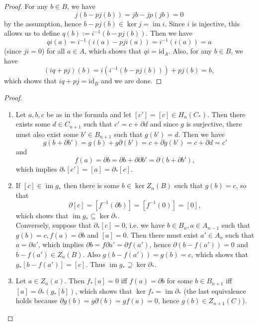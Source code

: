 \documentclass[12pt,a4paper]{article}
\newcommand{\id}{\mathrm{id}}
\DeclareMathOperator{\im}{im}
\newcommand{\dd}{\partial}
\newcounter{exercise}
\begin{document}
\pagestyle{fancy}                      %
\fancyhf{}                             %
\addtolength{\topmargin}{-30 pt}                   %
\setlength{\headsep}{10 pt}                      %
\renewcommand{\headrulewidth}{1 pt}                %
\renewcommand*{\proofname}{Solution}
\ex\mbox{} 
\begin{proof}
For any $b\in B$, we have $$j(b-pj(b))=jb-jp(jb)=0$$ by the assumption, hence $b-pj(b)\in \ker j=\im i$. Since $i$ is injective, this allows us to define $q(b):=i^{-1}(b-pj(b)).$ Then we have $$qi(a)=i^{-1}(i(a)-pji(a))=i^{-1}(i(a))=a$$ (since $ji=0$) for all $a\in A$, which shows that $qi=\id_A$. Also, for any $b\in B$, we have $$(iq+pj)(b)=i(i^{-1}(b-pj(b)))+pj(b)=b,$$
which shows that $iq+pj=\id_B$ and we are done.
\end{proof}

\ex\mbox{} 
\begin{proof}\mbox{}
\begin{enumerate}[(1)]
\item 
Let $a,b,c$ be as in the formula and let $[c']=[c]\in H_n(C_*)$. Then there exists some $d\in C_{n+1}$ such that $c'=c+\dd d$ and since $g$ is surjective, there must also exist some $b'\in B_{n+1}$ such that $g(b')=d$. Then we have
$$g(b+\dd b')=g(b)+g\dd (b')=c+\dd g(b')=c+\dd d=c'$$
and $$f(a)=\dd b=\dd b+\dd \dd b'=\dd (b+\dd b'),$$
which implies $\dd_*[c']=[a]=\dd_*[c]$.
\item 
If $[c]\in \im g_*$ then there is some $b\in \ker Z_n(B)$ such that $g(b)=c$, so that $$\dd [c]=[f^{-1}(\dd b)]=[f^{-1}(0)]=[0],$$ which shows that $\im g_*\subseteq \ker \dd_*$.\\
Conversely, suppose that $\dd_*[c]=0$, i.e. we have $b\in B_n,a\in A_{n-1}$ such that $g(b)=c, f(a)=\dd b$ and $[a]=0$. Then there must exist $a'\in A_n$ such that $a=\dd a'$, which implies $\dd b=f\dd a'=\dd f(a')$, hence $\dd (b-f(a'))=0$ and $b-f(a')\in Z_n(B)$. Also $g(b-f(a'))=g(b)=c$, which shows that $g_*[b-f(a')]=[c]$. Thus $\im g_*\supseteq \ker \dd_*$.
\item Let $a\in Z_n(a)$. Then $f_*[a]=0$ iff $f(a)=\dd b$ for some $b\in B_{n+1}$ iff $[a]=\dd_*(g_*[b])$, which shows that $\ker f_*=\im \dd_*$ (the last equivalence holds because $\dd g(b)=g\dd (b)=gf(a)=0$, hence $g(b)\in Z_{n+1}(C)$).
\end{enumerate} 
\end{proof}
\end{document}
